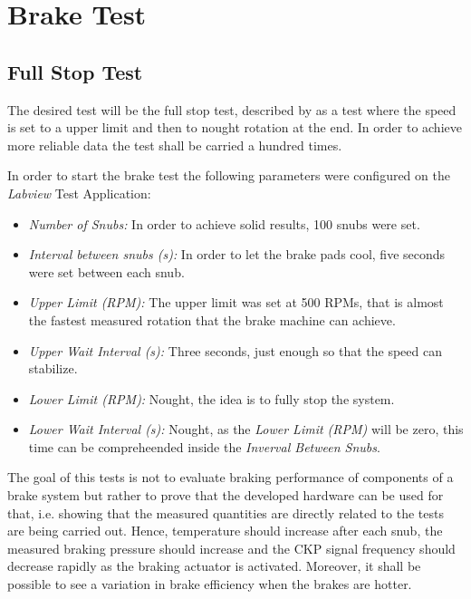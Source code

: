 \section{Brake Test}\label{sec:brakeTest}

	\subsection{Full Stop Test}

		The desired test will be the full stop test, described by \cite{caixeta2017} as a test where the speed is set to a upper limit and then to nought rotation at the end. In order to achieve more reliable data the test shall be carried a hundred times.

		\par
		In order to start the brake test the following parameters were configured on the \textit{Labview} Test Application:

		\begin{itemize}
			\item\textit{Number of Snubs:} In order to achieve solid results, 100 snubs were set.
			\item\textit{Interval between snubs (s):} In order to let the brake pads cool, five seconds were set between each snub.
			\item\textit{Upper Limit (RPM):} The upper limit was set at 500 RPMs, that is almost the fastest measured rotation that the brake machine can achieve.
			\item\textit{Upper Wait Interval (s):} Three seconds, just enough so that the speed can stabilize.
			\item\textit{Lower Limit (RPM):} Nought, the idea is to fully stop the system.
			\item\textit{Lower Wait Interval (s):} Nought, as the \textit{Lower Limit (RPM)} will be zero, this time can be compreheended inside the \textit{Inverval Between Snubs}.
		\end{itemize}

		The goal of this tests is not to evaluate braking performance of components of a brake system but rather to prove that the developed hardware can be used for that, i.e. showing that the measured quantities are directly related to the tests are being carried out. Hence, temperature should increase after each snub, the measured braking pressure should increase and the CKP signal frequency should decrease rapidly as the braking actuator is activated. Moreover, it shall be possible to see a variation in brake efficiency when the brakes are hotter.

